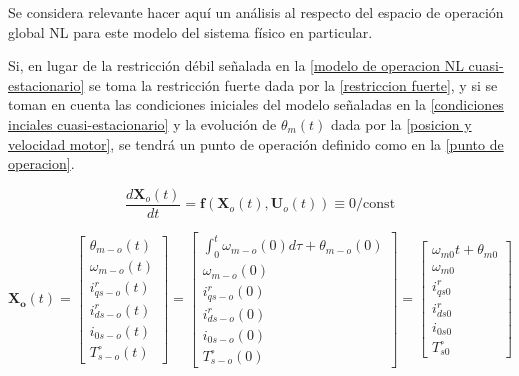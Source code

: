 \documentclass[a4paper, 10pt, onecolumn,journal]{ieeeconf}
\begin{document}
Se considera relevante hacer aquí un análisis al respecto
del espacio de operación global NL para este modelo del sistema físico
en particular.

Si, en lugar de la restricción débil señalada en la \cref{modelo de operacion NL cuasi-estacionario}
se toma la restricción fuerte dada por la \cref{restriccion fuerte}, y si se toman en cuenta
las condiciones iniciales del modelo señaladas en la \cref{condiciones inciales cuasi-estacionario} y 
la evolución de $\theta_m(t)$ dada por la \cref{posicion y velocidad motor}, se tendrá un
punto de operación definido como en la \cref{punto de operacion}.


\begin{equation}
    \frac{d\mathbf{X}_o(t)}{dt} =  \mathbf{f}(\mathbf{X}_o(t), \mathbf{U}_o(t)) \equiv 0/\text{const}
    \label{restriccion fuerte}
\end{equation}

\begin{equation}
    \mathbf{X_o}(t)
    =
    \begin{bmatrix} 
        \theta_{m-o}(t) \\ 
        \omega_{m-o}(t) \\ 
        i^r_{qs-o}(t) \\ 
        i^r_{ds-o}(t)\\ 
        i_{0s-o}(t)\\ 
        T^\circ_{s-o}(t)
    \end{bmatrix}
    =
    \begin{bmatrix} 
        \int_{0}^{t} \omega_{m-o}(0) d\tau + \theta_{m-o}(0)\\
        \omega_{m-o}(0)\\
        i^r_{qs-o}(0) \\
        i^r_{ds-o}(0)\\
        i_{0s-o}(0)\\
        T^\circ_{s-o}(0)
    \end{bmatrix}
    =
    \begin{bmatrix} 
        \omega_{m0}t + \theta_{m0}\\
        \omega_{m0} \\ 
        i^r_{qs0} \\ 
        i^r_{ds0} \\ 
        i_{0s0} \\ 
        T^\circ_{s0} 
    \end{bmatrix}
    \label{punto de operacion}
\end{equation}
\end{document}
